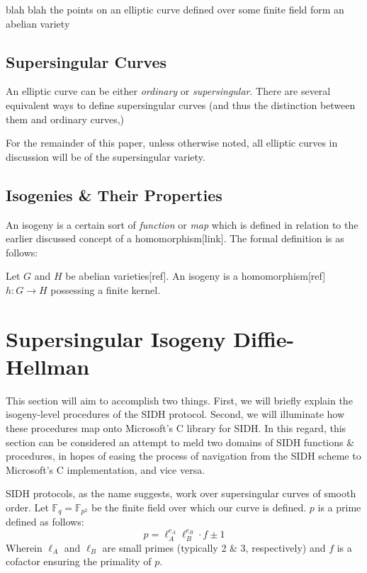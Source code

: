 blah blah the points on an elliptic curve defined over some finite field form an abelian variety

\subsection{Supersingular Curves}

An elliptic curve can be either \emph{ordinary} or \emph{supersingular}. There are several equivalent ways to define supersingular curves (and thus the distinction between them and ordinary curves,)

For the remainder of this paper, unless otherwise noted, all elliptic curves in discussion will be of the supersingular variety.

\subsection{Isogenies \& Their Properties}

An isogeny is a certain sort of \emph{function} or \emph{map} which is defined in relation to the earlier discussed concept of a homomorphism[link]. The formal definition is as follows:\\
\begin{definition}[Isogeny]
\label{defn:isogeny}
Let $G$ and $H$ be abelian varieties[ref]. An isogeny is a homomorphism[ref] $h: G \rightarrow H$ possessing a finite kernel.
\end{definition}

\section{Supersingular Isogeny Diffie-Hellman}

This section will aim to accomplish two things. First, we will briefly explain the isogeny-level procedures of the SIDH protocol. Second, we will illuminate how these procedures map onto Microsoft's C library for SIDH. In this regard, this section can be considered an attempt to meld two domains of SIDH functions \& procedures, in hopes of easing the process of navigation from the SIDH scheme to Microsoft's C implementation, and vice versa.

SIDH protocols, as the name suggests, work over supersingular curves of smooth order. Let $\mathbb{F}_q = \mathbb{F}_{p^2}$ be the finite field over which our curve is defined. $p$ is a prime defined as follows:
$$
p = \ell_{A}^{e_A}\ell_{B}^{e_B} \cdot f \pm 1
$$
Wherein $\ell_{A}$ and $\ell_{B}$ are small primes (typically 2 \& 3, respectively) and $f$ is a cofactor ensuring the primality of $p$.

